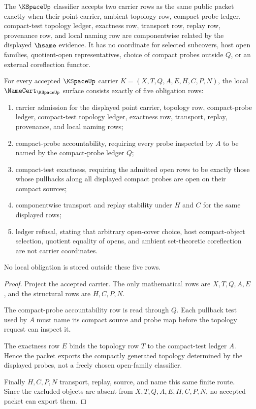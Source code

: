 \begin{definition}
\label{def:k-space-classifier}
The $\KSpaceUp$ classifier accepts two carrier rows as the same public packet exactly when their point carrier, ambient topology row, compact-probe ledger, compact-test topology ledger, exactness row, transport row, replay row, provenance row, and local naming row are componentwise related by the displayed $\hsame$ evidence. It has no coordinate for selected subcovers, host open families, quotient-open representatives, choice of compact probes outside $Q$, or an external coreflection functor.
\end{definition}

\begin{theorem}
\label{thm:k-space-namecert-obligations}
For every accepted $\KSpaceUp$ carrier $K=(X,T,Q,A,E,H,C,P,N)$, the local $\NameCert_{\KSpaceUp}$ surface consists exactly of five obligation rows:
\begin{enumerate}
\item carrier admission for the displayed point carrier, topology row, compact-probe ledger, compact-test topology ledger, exactness row, transport, replay, provenance, and local naming rows;
\item compact-probe accountability, requiring every probe inspected by $A$ to be named by the compact-probe ledger $Q$;
\item compact-test exactness, requiring the admitted open rows to be exactly those whose pullbacks along all displayed compact probes are open on their compact sources;
\item componentwise transport and replay stability under $H$ and $C$ for the same displayed rows;
\item ledger refusal, stating that arbitrary open-cover choice, host compact-object selection, quotient equality of opens, and ambient set-theoretic coreflection are not carrier coordinates.
\end{enumerate}
No local obligation is stored outside these five rows.
\end{theorem}
\begin{proof}
Project the accepted carrier. The only mathematical rows are $X,T,Q,A,E$, and the structural rows are $H,C,P,N$.

The compact-probe accountability row is read through $Q$. Each pullback test used by $A$ must name its compact source and probe map before the topology request can inspect it.

The exactness row $E$ binds the topology row $T$ to the compact-test ledger $A$. Hence the packet exports the compactly generated topology determined by the displayed probes, not a freely chosen open-family classifier.

Finally $H,C,P,N$ transport, replay, source, and name this same finite route. Since the excluded objects are absent from $X,T,Q,A,E,H,C,P,N$, no accepted packet can export them.
\end{proof}

